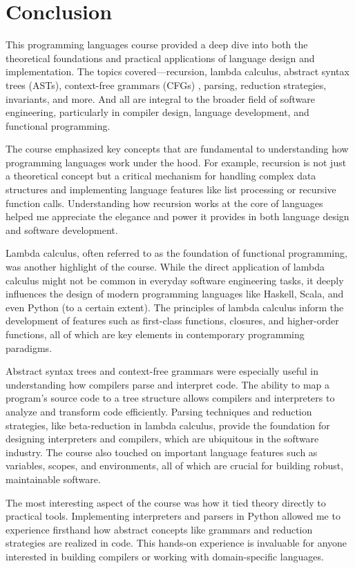 \documentclass{article}
\theoremstyle{theorem}
\theoremstyle{definition}
\theoremstyle{remark}
\begin{document}
\section{Conclusion}\label{conclusion}
This programming languages course provided a deep dive into both the theoretical foundations and practical applications 
of language design and implementation. The topics covered—recursion, lambda calculus, abstract syntax trees (ASTs), context-free grammars (CFGs)
, parsing, reduction strategies, invariants, and more. And all are integral to the broader field of software engineering, particularly in compiler design, 
language development, and functional programming.

The course emphasized key concepts that are fundamental to understanding how programming languages work under the hood. For example, recursion is not
 just a theoretical concept but a critical mechanism for handling complex data structures and implementing language features like list processing or recursive
function calls. Understanding how recursion works at the core of languages helped me appreciate the elegance and power it provides in both language design
and software development.

Lambda calculus, often referred to as the foundation of functional programming, was another highlight of the course. While the direct application of lambda 
calculus might not be common in everyday software engineering tasks, it deeply influences the design of modern programming languages like Haskell, Scala, 
and even Python (to a certain extent). The principles of lambda calculus inform the development of features such as first-class functions, closures, and 
higher-order functions, all of which are key elements in contemporary programming paradigms.

Abstract syntax trees and context-free grammars were especially useful in understanding how compilers parse and interpret code. The ability to map a program’s 
source code to a tree structure allows compilers and interpreters to analyze and transform code efficiently. Parsing techniques and reduction strategies, like 
beta-reduction in lambda calculus, provide the foundation for designing interpreters and compilers, which are ubiquitous in the software industry. The course also 
touched on important language features such as variables, scopes, and environments, all of which are crucial for building robust, maintainable software.

The most interesting aspect of the course was how it tied theory directly to practical tools. Implementing interpreters and parsers in Python allowed me to 
experience firsthand how abstract concepts like grammars and reduction strategies are realized in code. This hands-on experience is invaluable for anyone 
interested in building compilers or working with domain-specific languages.
\end{document}
